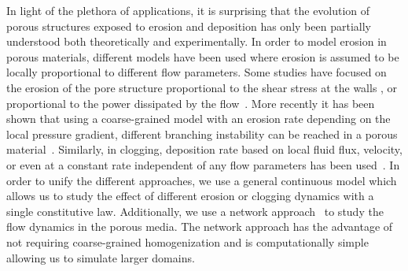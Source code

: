 \documentclass[%
 reprint,
 amsmath,amssymb,
 aps,
]{revtex4-1}
\begin{document}



In light of the plethora of applications, it is surprising that the evolution of porous structures exposed to erosion and deposition has only been partially understood both theoretically and experimentally. In order to model erosion in porous materials, different models have been used where erosion is assumed to be locally proportional to different flow parameters. Some studies have focused on the erosion of the pore structure proportional to the shear stress at the walls \cite{jager2017channelization,ristroph2012sculpting,hacking1996shear,wan2004investigation}, or proportional to the power dissipated by the flow~\cite{steeb2007modeling,marot2012study,sibille2015internal}. 
More recently it has been shown that using a coarse-grained model with an erosion rate depending on the local pressure gradient, different branching instability can be reached in a porous material~\cite{derr2020flow,mahadevan2012flow}.  
Similarly, in clogging, deposition rate based on local fluid flux, velocity, or even at a constant rate independent of any flow parameters has been used~\cite{yang2017pore,reddi2000permeability,boccardo2014microscale}. In order to unify the different approaches, we use a general continuous model which allows us to study the effect of different erosion or clogging dynamics with a single constitutive law. Additionally, we use a network approach~\cite{alim2017local,fatt1956network, blunt2013pore,stoop2019disorder,bryant1993network} to study the flow dynamics in the porous media.  The network approach has the advantage of not requiring coarse-grained homogenization and is computationally simple allowing us to simulate larger domains.
\end{document}
